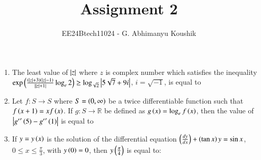 \documentclass[journal,12pt,onecolumn]{IEEEtran}
\theoremstyle{remark}
\begin{document}
\title{Assignment 2}
\author{EE24Btech11024 - G. Abhimanyu Koushik}
\maketitle
\renewcommand{\thefigure}{\theenumi}
\renewcommand{\thetable}{\theenumi}
\begin{enumerate}

\item The least value of $\left\vert z\right\vert$ where $z$ is complex number which satisfies the inequality $\exp\left(\frac{\left(\left\vert z\right\vert+3\right)\left(\left\vert z\right\vert-1\right)}{\left\vert{\left\vert z\right\vert+1}\right\vert}\log_e{2}\right)\ge\log_{\sqrt{2}}{\left\vert5\sqrt{7}+9i\right\vert}$, $i=\sqrt{-1}$, is equal to

\hfill{}
\begin{enumerate}
\end{enumerate}

\item Let $f:S\rightarrow S$ where $S=\left(0,\infty\right)$ be a twice differentiable function such that $f\left(x+1\right)=xf\left(x\right)$. If $g:S\rightarrow \mathbb{R}$ be defined as $g\left(x\right) = \log_e{f\left(x\right)}$, then the value of $\left\vert{g^\prime}^\prime \left(5\right)-{g^\prime}^\prime \left(1\right)\right\vert$ is equal to 

\hfill{}
\begin{enumerate}
\end{enumerate}

\item If $y=y\left(x\right)$ is the solution of the differential equation $\left(\frac{dy}{dx}\right)+\left(\tan x\right)y=\sin x$, $0\leq x\leq \frac{\pi}{3}$, with $y\left(0\right)=0$, then $y\left(\frac{\pi}{4}\right)$ is equal to:
\hfill{}
\begin{enumerate}
\end{enumerate}


\end{enumerate}
\end{document}
